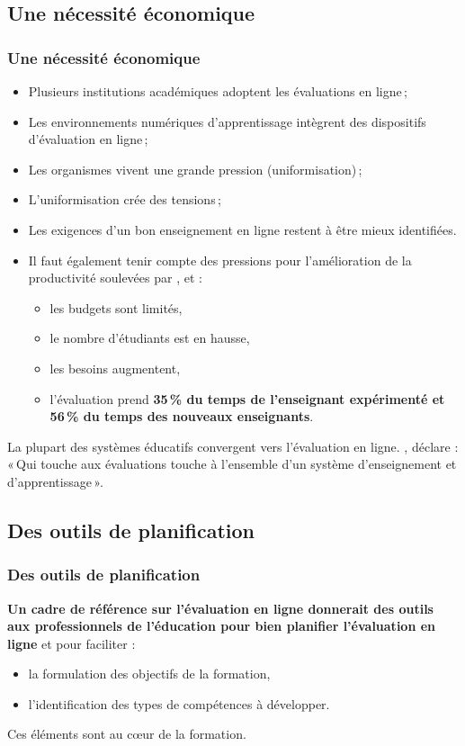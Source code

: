 \documentclass{beamer}
\begin{document}
		\subsection{Une nécessité économique} 
			\begin{frame}[allowframebreaks]
			 	\frametitle{Une nécessité économique \citep{Dubreucq2011}}
				\begin {itemize}
					\item Plusieurs institutions académiques adoptent les évaluations en ligne\,;
					\item Les environnements numériques d'apprentissage intègrent des dispositifs d'évaluation en ligne\,;
					\item Les organismes vivent une grande pression (uniformisation)\,;
					\item L'uniformisation crée des tensions\,;
					\item Les exigences d'un bon enseignement en ligne restent à être mieux identifiées.
					\framebreak
					\item Il faut également tenir compte des pressions pour l'amélioration de la productivité soulevées par \citet{audet2011a}, \citet{dirks1998a} et \citet{becta2006a} : 
						\begin {itemize}
							\item les budgets sont limités,
							\item le nombre d'étudiants est en hausse,
							\item les besoins augmentent,
							\item l'évaluation prend \textbf{35\,\% du temps de l'enseignant expérimenté et 56\,\% du temps des nouveaux enseignants}.
						\end{itemize}		
				\end{itemize}
				\framebreak
				La plupart des systèmes éducatifs convergent vers l'évaluation en ligne.
				\citet{Dubreucq2011}, déclare : «\,Qui touche aux évaluations touche à l'ensemble d'un système d'enseignement et d'apprentissage\,».
			\end{frame}
			
		
			
			\subsection{Des outils de planification} 
				\begin{frame}
			 		\frametitle{Des outils de planification \citep{Dubreucq2011}}
					\textbf{Un cadre de référence sur l'évaluation en ligne donnerait des outils aux professionnels de l'éducation pour bien planifier l'évaluation en ligne}  et pour faciliter :
					\begin {itemize}
						\item la formulation des objectifs de la formation,
						\item l'identification des types de compétences à développer.
					\end{itemize}
					Ces éléments sont au c\oe ur de la formation.
				\end{frame}
			
\end{document}
